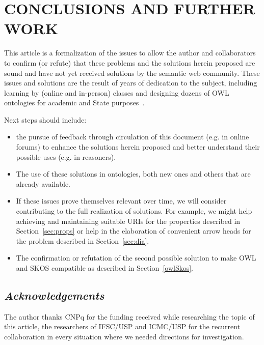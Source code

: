 \documentclass[12pt,fleqn]{article}
\begin{document}
\section{CONCLUSIONS AND FURTHER WORK}\label{sec:con}
This article is a formalization of the issues to allow
the author and collaborators to confirm (or refute) that these problems
and the solutions herein proposed are sound and have not yet received
solutions by the semantic web community.
These issues and solutions are the result of years of dedication
to the subject, including learning by (online and in-person) classes
and designing dozens of OWL ontologies for academic and State purposes~\citep{pnud5,fabbri1,losd}.

Next steps should include:
\begin{itemize}
	\item the pursue of feedback through circulation of this document (e.g. in online forums)
		to enhance the solutions herein proposed and better understand their possible uses (e.g. in reasoners).
	\item The use of these solutions in ontologies, both new ones and others that are already available.
	\item If these issues prove themselves relevant over time, we will consider contributing to the full realization of solutions.
		For example, we might help achieving and maintaining suitable URIs for the properties described in Section~\ref{sec:props}
		or help in the elaboration of convenient arrow heads for the problem described in Section~\ref{sec:dia}.
	\item The confirmation or refutation of the second possible solution to make OWL and SKOS compatible as described in Section~\ref{owlSkos}.
\end{itemize}




\subsection*{\textit{Acknowledgements}}
The author thanks CNPq for the funding received while researching the topic of this article,
the researchers of IFSC/USP and ICMC/USP for the recurrent collaboration in every situation
where we needed directions for investigation.
\end{document}
